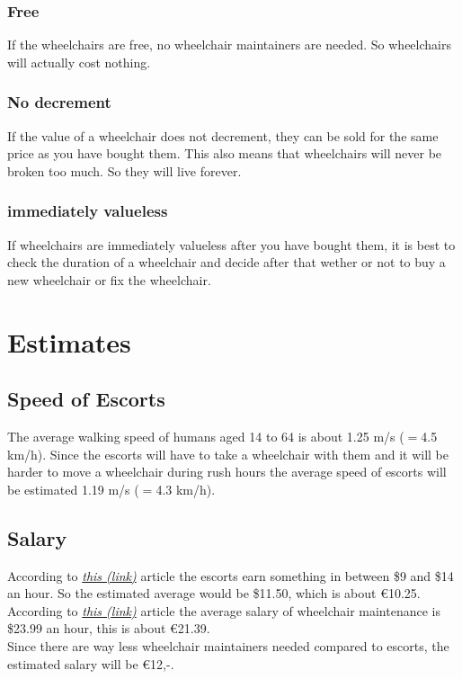 \documentclass[a4paper, 11pt, notitlepage]{report}
\begin{document}
\subsection{Free}
If the wheelchairs are free, no wheelchair maintainers are needed. So wheelchairs will actually cost nothing.
\subsection{No decrement}
If the value of a wheelchair does not decrement, they can be sold for the same price as you have bought them. This also means that wheelchairs will never be broken too much. So they will live forever.
\subsection{immediately valueless}
If wheelchairs are immediately valueless after you have bought them, it is best to check the duration of a wheelchair and decide after that wether or not to buy a new wheelchair or fix the wheelchair.
\chapter{Estimates}
    \section{Speed of Escorts}
    The average walking speed of humans aged 14 to 64 is about 1.25 m/s  ($=$4.5 km/h). Since the escorts will have to take a wheelchair with them and it will be harder to move a wheelchair during rush hours the average speed of escorts will be estimated 1.19 m/s ($=$4.3 km/h).
    \section{Salary}
    According to \href{https://disabledaccessdenied.wordpress.com/2012/10/08/airport-wheelchair-fakes-are-making-life-hard-for-disabled-travellers/}{\emph{this (link)}} article the escorts earn something in between \$9 and \$14 an hour. So the estimated average would be \$11.50, which is about \euro{10.25}.\\
    According to \href{http://work.chron.com/average-wage-wheelchair-repair-19790.html}{\emph{this (link)}} article the average salary of wheelchair maintenance is \$23.99 an hour, this is about \euro{21.39}.\\
    Since there are way less wheelchair maintainers needed compared to escorts, the estimated salary will be \euro{12,-}.
\end{document}
